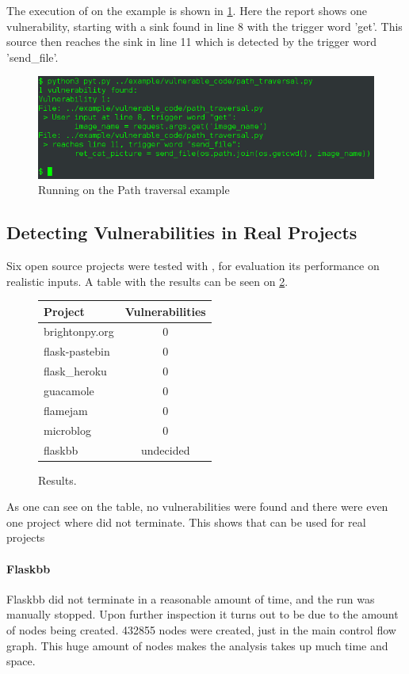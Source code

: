 The execution of \pyt{} on the example is shown in \cref{path_traversal:console}.
Here the report shows one vulnerability, starting with a sink found in line 8 with the trigger word 'get'.
This source then reaches the sink in line 11 which is detected by the trigger word 'send\_file'.

\begin{figure}
  \includegraphics[width=\textwidth]{./figures/path_traversal_console.png}
  \caption{Running \pyt{} on the Path traversal example}
  \label{path_traversal:console}
\end{figure}

\subsection{Detecting Vulnerabilities in Real Projects}\label{evaluation:real}
Six open source projects were tested with \pyt{}, for evaluation its performance on realistic inputs.
A table with the results can be seen on \cref{evaluation:real:table}.

\begin{figure}
  \centering
  \begin{tabular}{|l|c|}
    \hline
    \textbf{Project} & \textbf{Vulnerabilities} \\
    \hline
    \hline
    brightonpy.org\cite{brightonpy} & 0 \\
    flask-pastebin\cite{flask_pastebin} & 0 \\
    flask\_heroku\cite{flask_heroku} & 0 \\
    guacamole\cite{guacamole} & 0 \\
    flamejam\cite{flamejam} & 0 \\
    microblog\cite{microblog} & 0 \\
    flaskbb\cite{flaskbb} & undecided \\
    \hline
  \end{tabular}
  \caption{Results.}
  \label{evaluation:real:table}
\end{figure}

As one can see on the table, no vulnerabilities were found and there were even one project where \pyt{} did not terminate.
This shows that \pyt{} can be used for real projects

\paragraph{Flaskbb}
Flaskbb did not terminate in a reasonable amount of time, and the run was manually stopped.
Upon further inspection it turns out to be due to the amount of nodes being created.
432855 nodes were created, just in the main control flow graph.
This huge amount of nodes makes the analysis takes up much time and space.

